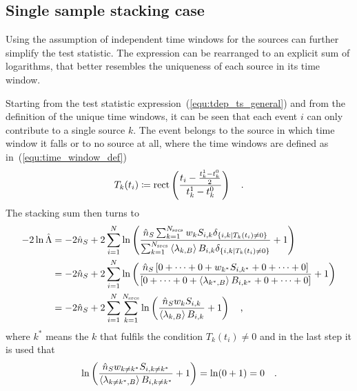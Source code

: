 \subsection{Single sample stacking case}
  \label{chp:pointsource_tdep_llh_single}
Using the assumption of independent time windows for the sources can further simplify the test statistic.
The expression can be rearranged to an explicit sum of logarithms, that better resembles the uniqueness of each source in its time window.

Starting from the test statistic expression~(\ref{equ:tdep_ts_general})
and from the definition of the unique time windows, it can be seen that each event $i$ can only contribute to a single source $k$.
The event belongs to the source in which time window it falls or to no source at all, where the time windows are defined as in~(\ref{equ:time_window_def})
\begin{equation}
  T_k(t_i) \coloneqq \operatorname{rect} \left(
    \frac{t_i - \frac{t_k^1-t_k^0}{2}} {t_k^1-t_k^0}
  \right)
  \quad\text{.}
\end{equation}
The stacking sum then turns to
\begin{align}
  -2\ln\hat{\Lambda}
  &= -2\hat{n}_S +
      2\sum_{i=1}^N \ln\left(
        \frac{\hat{n}_S \sum_{k=1}^{N_\text{srcs}} w_k S_{i,k}
              \delta_{\{i,k|T_k(t_i)\neq 0\}}}
             {\sum_{k=1}^{N_\text{srcs}}\Braket{\lambda_{k,B}} B_{i,k}
              \delta_{\{i,k|T_k(t_i)\neq 0\}}}
        + 1
      \right) \\
  &= -2\hat{n}_S +
      2\sum_{i=1}^N \ln\left(
        \frac{\hat{n}_S \left[0+\dots+0+ w_{k^*} S_{i,k^*} +0+\dots+0\right]}
             {\left[
              0+\dots+0+ \Braket{\lambda_{k^*,B}} B_{i,k^*} +0+\dots+0
              \right]}
        + 1
      \right) \\
  &= -2\hat{n}_S +
      2\sum_{i=1}^N \sum_{k=1}^{N_\text{srcs}} \ln\left(
        \frac{\hat{n}_S w_k S_{i,k}}{\Braket{\lambda_{k,B}} B_{i,k}}
        + 1
      \right)
  \quad\text{,}
\end{align}
where $k^*$ means the $k$ that fulfils the condition $T_k(t_i)\neq 0$ and in the last step it is used that
\begin{equation}
  \ln\left(
      \frac{\hat{n}_S w_{k\neq k^*} S_{i,k\neq k^*}}
           {\Braket{\lambda_{k\neq k^*,B}} B_{i,k\neq k^*}}
      + 1
    \right)
    = \ln(0 + 1) = 0
  \quad\text{.}
\end{equation}

